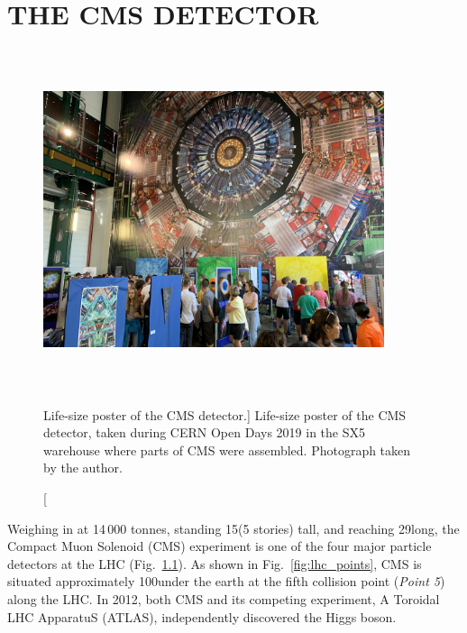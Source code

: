 \chapter{THE CMS DETECTOR} 
\label{ch:cms}
\begin{figure}[h]
\centering
\includegraphics[width=10cm,height=10cm,keepaspectratio]{figures/cms/cms_poster_SX5.jpg}
    \caption
        [Life-size poster of the CMS detector.]
        {Life-size poster of the CMS detector, taken during CERN Open Days 2019
        in the SX5 warehouse where parts of CMS were assembled.
        Photograph taken by the author.}
    \label{fig:cms_poster}
\end{figure}
Weighing in at 14\,000 tonnes, standing 15\meter (5 stories) tall, and reaching 29\meter long, the Compact Muon Solenoid (CMS) experiment is one of 
the four major particle detectors at the LHC (Fig.~\ref{fig:cms_poster}).
As shown in Fig.~\ref{fig:lhc_points}, CMS is situated approximately 100\meter under the earth at the fifth collision point (\emph{Point 5}) along the LHC.
In 2012, both CMS and its competing experiment, A Toroidal LHC ApparatuS (ATLAS), independently discovered the Higgs boson.
